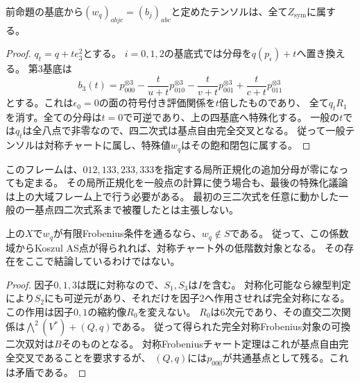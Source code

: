 \begin{corollary}[五係数域全体での対称成分の閉包への所属]
\label{cor:boolean-family-in-symmetric-closure}
前命題の基底から$(w_q)_{abjc}=(b_j)_{abc}$と定めたテンソルは、全て$Z_{\mathrm{sym}}$に属する。
\end{corollary}
\begin{proof}
$q_t=q+t e_3^2$とする。
$i=0,1,2$の基底式では分母を$q(p_\epsilon)+t$へ置き換える。
第3基底は
\[
 b_3(t)=p_{000}^{\otimes3}
 -\frac{t}{u+t}p_{010}^{\otimes3}
 -\frac{t}{v+t}p_{001}^{\otimes3}
 +\frac{t}{c+t}p_{011}^{\otimes3}
\]
とする。これは$\epsilon_0=0$の面の符号付き評価関係を$t$倍したものであり、
全て$q_tR_1$を消す。全ての分母は$t=0$で可逆であり、上の四基底へ特殊化する。
一般の$t$では$q_t$は全八点で非零なので、四二次式は基点自由完全交叉となる。
従って一般テンソルは対称チャートに属し、特殊値$w_q$はその飽和閉包に属する。
\end{proof}

\begin{remark}
このフレームは、$012,133,233,333$を指定する局所正規化の追加分母が零になっても定まる。
その局所正規化を一般点の計算に使う場合も、最後の特殊化議論は上の大域フレーム上で行う必要がある。
最初の三二次式を任意に動かした一般の一基点四二次式系まで被覆したとは主張しない。
\end{remark}

\begin{corollary}[Frobenius境界上の非対称化性]
\label{cor:boolean-frobenius-not-symmetric}
上の$X$で$w_q$が有限Frobenius条件を通るなら、$w_q\notin S$である。
従って、この係数域からKoszul AS点が得られれば、対称チャート外の低階数対象となる。
その存在をここで結論しているわけではない。
\end{corollary}
\begin{proof}
因子$0,1,3$は既に対称なので、$S_1,S_3$は$I$を含む。
対称化可能なら線型判定により$S_2$にも可逆元があり、それだけを因子2へ作用させれば完全対称になる。
この作用は因子$0,1$の縮約像$R_0$を変えない。
$R_0$は6次元であり、その直交二次関係は$\bigwedge^2(V^*)+(Q,q)$である。
従って得られた完全対称Frobenius対象の可換二次双対は$B$そのものとなる。
対称Frobeniusチャート定理はこれが基点自由完全交叉であることを要求するが、
$(Q,q)$には$p_{000}$が共通基点として残る。これは矛盾である。
\end{proof}

